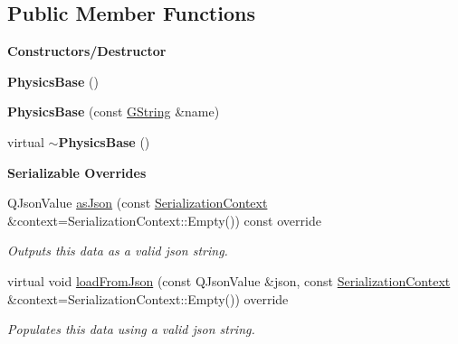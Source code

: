 \subsection*{Public Member Functions}
\begin{Indent}\textbf{ Constructors/\+Destructor}\par
\begin{DoxyCompactItemize}
\item 
\mbox{\label{classrev_1_1_physics_base_a00b7a64a9121b869682b7dea4b03b280}} 
{\bfseries Physics\+Base} ()
\item 
\mbox{\label{classrev_1_1_physics_base_a1eaa0d593d7b752018ed86d2b35ce0ee}} 
{\bfseries Physics\+Base} (const \mbox{\hyperlink{classrev_1_1_g_string}{G\+String}} \&name)
\item 
\mbox{\label{classrev_1_1_physics_base_abdf3dc537fd2b10be679ffbef45e0d40}} 
virtual {\bfseries $\sim$\+Physics\+Base} ()
\end{DoxyCompactItemize}
\end{Indent}
\begin{Indent}\textbf{ Serializable Overrides}\par
\begin{DoxyCompactItemize}
\item 
\mbox{\label{classrev_1_1_physics_base_a1167d8881c13d17bf6eb2b9e151fff2e}} 
Q\+Json\+Value \mbox{\hyperlink{classrev_1_1_physics_base_a1167d8881c13d17bf6eb2b9e151fff2e}{as\+Json}} (const \mbox{\hyperlink{structrev_1_1_serialization_context}{Serialization\+Context}} \&context=Serialization\+Context\+::\+Empty()) const override
\begin{DoxyCompactList}\small\item\em Outputs this data as a valid json string. \end{DoxyCompactList}\item 
\mbox{\label{classrev_1_1_physics_base_aa2ae8e658872d77f671777537602d3cd}} 
virtual void \mbox{\hyperlink{classrev_1_1_physics_base_aa2ae8e658872d77f671777537602d3cd}{load\+From\+Json}} (const Q\+Json\+Value \&json, const \mbox{\hyperlink{structrev_1_1_serialization_context}{Serialization\+Context}} \&context=Serialization\+Context\+::\+Empty()) override
\begin{DoxyCompactList}\small\item\em Populates this data using a valid json string. \end{DoxyCompactList}\end{DoxyCompactItemize}
\end{Indent}
